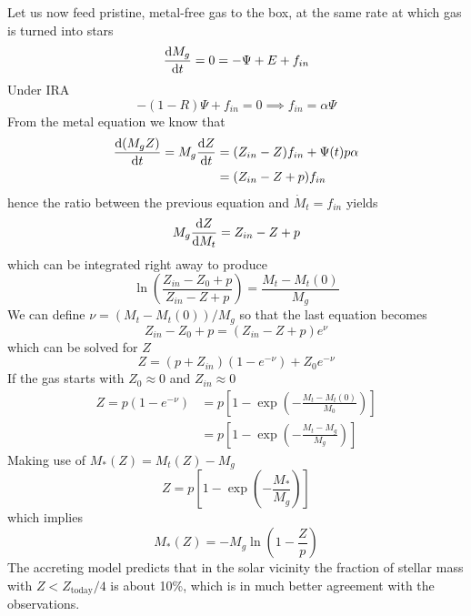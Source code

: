 Let us now feed pristine, metal-free gas to the box, at the same rate at which gas is turned into stars
\begin{equation*}
    \frac{\text{d}M_{g}}{\text{d}t} = 0 = -\Psi + E + f_{in}
\end{equation*}
Under IRA
\begin{equation*}
    -(1-R)\Psi +f_{in} = 0 \implies f_{in} = \alpha\Psi
\end{equation*}
From the metal equation we know that 
\begin{align*}
    \frac{\text{d}(M_{g}Z)}{\text{d}t}= M_{g}\frac{\text{d}Z}{\text{d}t} &= (Z_{in}-Z)f_{in}+\Psi(t)p\alpha\\
    &=(Z_{in}-Z+p)f_{in}
\end{align*}
hence the ratio between the previous equation and $\dot{M}_{t} = f_{in}$ yields
\begin{equation*}
    M_{g}\frac{\text{d}Z}{\text{d}M_{t}} = Z_{in}-Z+p
\end{equation*}
which can be integrated right away to produce 
\begin{equation*}
    \ln\left(\frac{Z_{in}-Z_{0}+p}{Z_{in}-Z+p}\right) = \frac{M_{t}-M_{t}(0)}{M_{g}}
\end{equation*}
We can define $\nu = (M_{t}-M_{t}(0))/M_{g}$ so that the last equation becomes
\begin{equation*}
    Z_{in}-Z_{0}+p = (Z_{in}-Z+p)e^{\nu}
\end{equation*}
which can be solved for $Z$
\begin{equation}
    Z = (p+Z_{in})(1-e^{-\nu})+Z_{0}e^{-\nu}
    \label{eq:metallicity_inflow}
\end{equation}
If the gas starts with $Z_{0}\approx 0$ and $Z_{in}\approx 0$
\begin{align*}
    Z = p(1-e^{-\nu}) &= p\left[1-\exp\left(-\frac{M_{t}-M_{t}(0)}{M_{0}}\right)\right]\\
    &= p\left[1-\exp\left(-\frac{M_{t}-M_{g}}{M_{g}}\right)\right]
\end{align*}
Making use of $M_{*}(Z) = M_{t}(Z)-M_{g}$
\begin{equation*}
    Z =  p\left[1-\exp\left(-\frac{M_{*}}{M_{g}}\right)\right]
\end{equation*}
which implies 
\begin{equation}
    M_{*}(Z) = -M_{g}\ln\left(1-\frac{Z}{p}\right)
\end{equation}
The accreting model predicts that in the solar vicinity the fraction of stellar mass with $Z < Z_{\text{today}}/4$ is about 10\%, which is in much better agreement with the observations.

